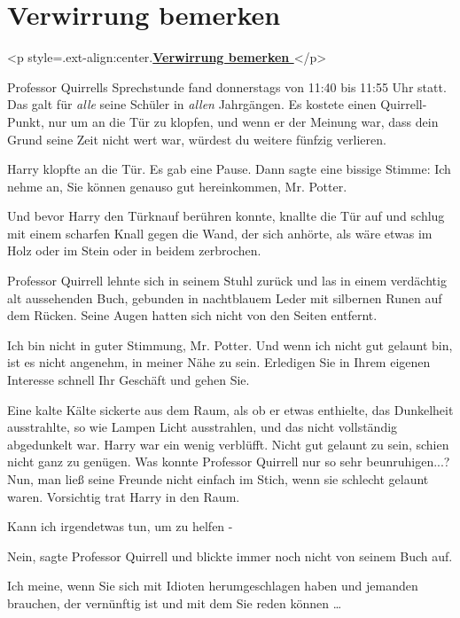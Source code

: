 
\chapter{Verwirrung bemerken}



		<p style=\grqq{}.ext-align:center\grqq{}.\textbf{\underline{Verwirrung
		bemerken }}</p>

Professor Quirrells Sprechstunde fand donnerstags von 11:40 bis 11:55 Uhr statt.
Das galt für \emph{alle} seine Schüler in \emph{allen} Jahrgängen. Es kostete
einen Quirrell-Punkt, nur um an die Tür zu klopfen, und wenn er der Meinung war,
dass dein Grund seine Zeit nicht wert war, würdest du weitere fünfzig verlieren.

Harry klopfte an die Tür. Es gab eine Pause. Dann sagte eine bissige Stimme:
\glqq Ich nehme an, Sie können genauso gut hereinkommen, Mr. Potter.\grqq{}

Und bevor Harry den Türknauf berühren konnte, knallte die Tür auf und schlug mit
einem scharfen Knall gegen die Wand, der sich anhörte, als wäre etwas im Holz
oder im Stein oder in beidem zerbrochen.

Professor Quirrell lehnte sich in seinem Stuhl zurück und las in einem
verdächtig alt aussehenden Buch, gebunden in nachtblauem Leder mit silbernen
Runen auf dem Rücken. Seine Augen hatten sich nicht von den Seiten entfernt.

\glqq Ich bin nicht in guter Stimmung, Mr. Potter. Und wenn ich nicht gut
gelaunt bin, ist es nicht angenehm, in meiner Nähe zu sein. Erledigen Sie in
Ihrem eigenen Interesse schnell Ihr Geschäft und gehen Sie.\grqq{}

Eine kalte Kälte sickerte aus dem Raum, als ob er etwas enthielte, das
Dunkelheit ausstrahlte, so wie Lampen Licht ausstrahlen, und das nicht
vollständig abgedunkelt war. Harry war ein wenig verblüfft. Nicht gut gelaunt zu
sein, schien nicht ganz zu genügen. Was konnte Professor Quirrell nur so sehr
beunruhigen...? Nun, man ließ seine Freunde nicht einfach im Stich, wenn sie
schlecht gelaunt waren. Vorsichtig trat Harry in den Raum.

\glqq Kann ich irgendetwas tun, um zu helfen -\grqq{}

\glqq Nein\grqq{}, sagte Professor Quirrell und blickte immer noch nicht von
seinem Buch auf.

\glqq Ich meine, wenn Sie sich mit Idioten herumgeschlagen haben und jemanden
brauchen, der vernünftig ist und mit dem Sie reden können …\grqq{}

